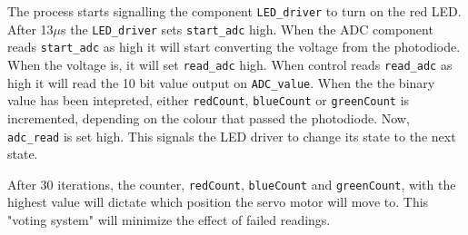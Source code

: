 The process starts signalling the component \texttt{LED\_driver} to turn on the red LED. 
After 13$\mu$s the \texttt{LED\_driver} sets \texttt{start\_adc} high. 
When the ADC component reads \texttt{start\_adc} as high it will start converting the voltage from the photodiode.  
When the voltage is, it will set \texttt{read\_adc} high. 
When control reads \texttt{read\_adc} as high it will read the 10 bit value output on \texttt{ADC\_value}. When the the binary value has been intepreted, either \texttt{redCount}, \texttt{blueCount} or \texttt{greenCount} is incremented, depending on the colour that passed the photodiode.
Now, \texttt{adc\_read} is set high. This signals the LED driver to change its state to the next state.

After 30 iterations, the counter, \texttt{redCount}, \texttt{blueCount} and \texttt{greenCount}, with the highest value will dictate which position the servo motor will move to.
This "voting system" will minimize the effect of failed readings.

